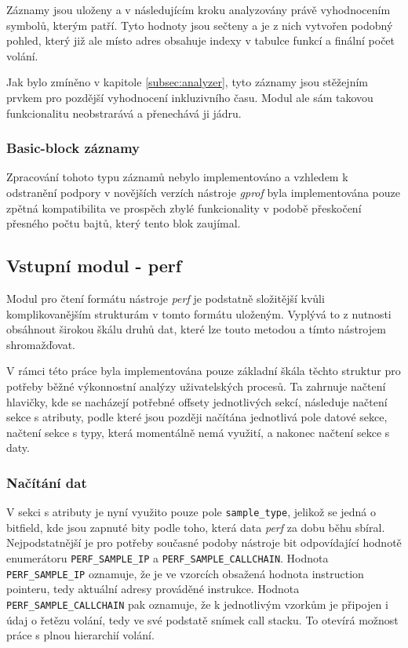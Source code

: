 \documentclass[czech,BP]{thesiskiv}
\begin{document}
Záznamy jsou uloženy a v následujícím kroku analyzovány právě vyhodnocením symbolů, kterým patří. Tyto hodnoty jsou sečteny a je z nich vytvořen podobný pohled, který již ale místo adres obsahuje indexy v tabulce funkcí a finální počet volání.

Jak bylo zmíněno v kapitole \ref{subsec:analyzer}, tyto záznamy jsou stěžejním prvkem pro pozdější vyhodnocení inkluzivního času. Modul ale sám takovou funkcionalitu neobstrarává a přenechává ji jádru.

\subsubsection*{Basic-block záznamy}

Zpracování tohoto typu záznamů nebylo implementováno a vzhledem k odstranění podpory v novějších verzích nástroje \emph{gprof} byla implementována pouze zpětná kompatibilita ve prospěch zbylé funkcionality v podobě přeskočení přesného počtu bajtů, který tento blok zaujímal.

\subsection{Vstupní modul - perf}

Modul pro čtení formátu nástroje \emph{perf} je podstatně složitější kvůli komplikovanějším strukturám v tomto formátu uloženým. Vyplývá to z nutnosti obsáhnout širokou škálu druhů dat, které lze touto metodou a tímto nástrojem shromažďovat.

V rámci této práce byla implementována pouze základní škála těchto struktur pro potřeby běžné výkonnostní analýzy uživatelských procesů. Ta zahrnuje načtení hlavičky, kde se nacházejí potřebné offsety jednotlivých sekcí, následuje načtení sekce s atributy, podle které jsou později načítána jednotlivá pole datové sekce, načtení sekce s typy, která momentálně nemá využití, a nakonec načtení sekce s daty.

\subsubsection*{Načítání dat}

V sekci s atributy je nyní využito pouze pole \texttt{sample\_type}, jelikož se jedná o bitfield, kde jsou zapnuté bity podle toho, která data \emph{perf} za dobu běhu sbíral. Nejpodstatnější je pro potřeby současné podoby nástroje bit odpovídající hodnotě enumerátoru \texttt{PERF\_SAMPLE\_IP} a \texttt{PERF\_SAMPLE\_CALLCHAIN}. Hodnota \texttt{PERF\_SAMPLE\_IP} oznamuje, že je ve vzorcích obsažená hodnota instruction pointeru, tedy aktuální adresy prováděné instrukce. Hodnota \texttt{PERF\_SAMPLE\_CALLCHAIN} pak oznamuje, že k jednotlivým vzorkům je připojen i údaj o řetězu volání, tedy ve své podstatě snímek call stacku. To otevírá možnost práce s plnou hierarchií volání.
\end{document}
